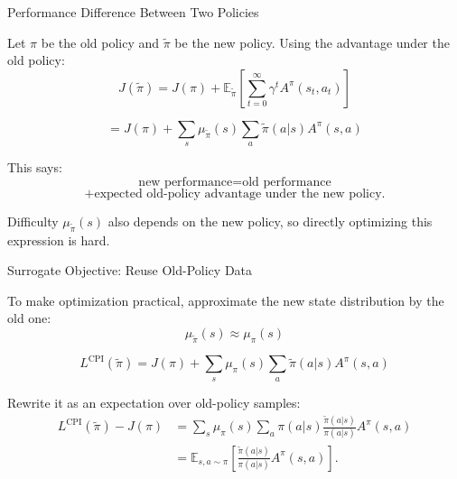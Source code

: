 \documentclass{beamer}
\begin{document}
\begin{frame}{Performance Difference Between Two Policies}

\small

Let \(\pi\) be the old policy and \(\tilde{\pi}\) be the new policy.
Using the advantage under the old policy:
\[
J(\tilde{\pi})
=
J(\pi)
+
\mathbb{E}_{\tilde{\pi}}
\left[
\sum_{t=0}^{\infty}
\gamma^t A^\pi(s_t,a_t)
\right]
\]

\[
=
J(\pi)
+
\sum_s
\mu_{\tilde{\pi}}(s)
\sum_a
\tilde{\pi}(a|s)
A^\pi(s,a)
\]

\vspace{0.1cm}

This says:
\[
\text{new performance}
=
\text{old performance}
\]
\[
+
\text{expected old-policy advantage under the new policy.}
\]

\begin{block}{Difficulty}
\(\mu_{\tilde{\pi}}(s)\) also depends on the new policy,
so directly optimizing this expression is hard.
\end{block}

\end{frame}

\begin{frame}{Surrogate Objective: Reuse Old-Policy Data}

\small

To make optimization practical, approximate the new state distribution
by the old one:
\[
\mu_{\tilde{\pi}}(s) \approx \mu_{\pi}(s)
\]

\[
L^{\mathrm{CPI}}(\tilde{\pi})
=
J(\pi)
+
\sum_s
\mu_{\pi}(s)
\sum_a
\tilde{\pi}(a|s)
A^\pi(s,a)
\]

\vspace{0.1cm}

Rewrite it as an expectation over old-policy samples:
\[
\begin{aligned}
L^{\mathrm{CPI}}(\tilde{\pi}) - J(\pi)
&=
\sum_s \mu_{\pi}(s)
\sum_a
\pi(a|s)
\frac{\tilde{\pi}(a|s)}{\pi(a|s)}
A^\pi(s,a)
\\
&=
\mathbb{E}_{s,a\sim\pi}
\left[
\frac{\tilde{\pi}(a|s)}{\pi(a|s)}
A^\pi(s,a)
\right].
\end{aligned}
\]

\end{frame}
\end{document}
